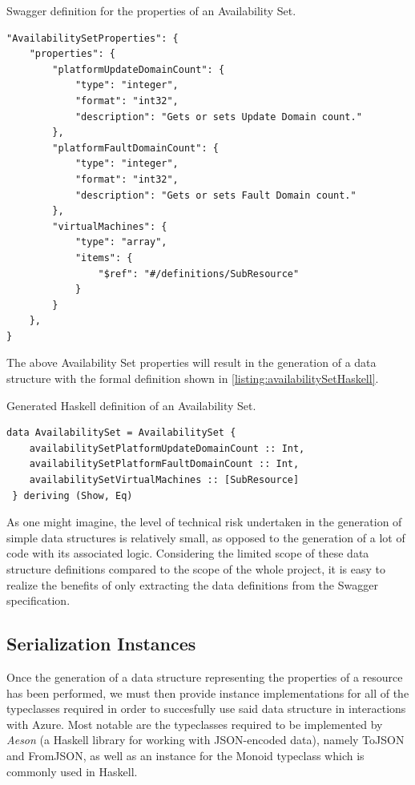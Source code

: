 \documentclass[11pt]{report}
\begin{document}
\begin{listing}[H]
\caption{Swagger definition for the properties of an Availability Set.}
\label{listing:availabilitySetPropertiesSwagger}
\begin{verbatim}
"AvailabilitySetProperties": {
    "properties": {
        "platformUpdateDomainCount": {
            "type": "integer",
            "format": "int32",
            "description": "Gets or sets Update Domain count."
        },
        "platformFaultDomainCount": {
            "type": "integer",
            "format": "int32",
            "description": "Gets or sets Fault Domain count."
        },
        "virtualMachines": {
            "type": "array",
            "items": {
                "$ref": "#/definitions/SubResource"
            }
        }
    },
}
\end{verbatim}
\end{listing}

The above Availability Set properties will result in the generation of a
data structure with the formal definition shown in
\autoref{listing:availabilitySetHaskell}.

\begin{listing}[H]
\caption{Generated Haskell definition of an Availability Set.}
\label{listing:availabilitySetHaskell}
\begin{verbatim}
data AvailabilitySet = AvailabilitySet {
    availabilitySetPlatformUpdateDomainCount :: Int,
    availabilitySetPlatformFaultDomainCount :: Int,
    availabilitySetVirtualMachines :: [SubResource]
 } deriving (Show, Eq)
\end{verbatim}
\end{listing}

As one might imagine, the level of technical risk undertaken in the generation
of simple data structures is relatively small, as opposed to the generation
of a lot of code with its associated logic. Considering the limited scope
of these data structure definitions compared to the scope of the whole
project, it is easy to realize the benefits of only extracting the data
definitions from the Swagger specification.

\subsection{Serialization Instances}

Once the generation of a data structure representing the properties of a
resource has been performed, we must then provide instance implementations for
all of the typeclasses required in order to succesfully use said data structure
in interactions with Azure. Most notable are the typeclasses required to be
implemented by  \textit{Aeson} (a Haskell library for working with JSON-encoded
data), namely ToJSON and FromJSON, as well as an instance for the Monoid
typeclass which is commonly used in Haskell.
\end{document}
